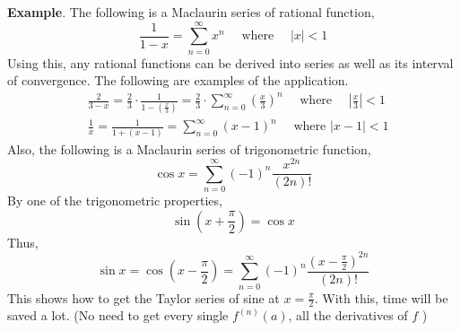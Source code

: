 \textbf{Example}. The following is a Maclaurin series of rational function,
$$
\frac{1}{1-x}=\sum_{n=0}^{\infty} x^{n} \quad \text { where } \quad|x|<1
$$
Using this, any rational functions can be derived into series as well as its interval of convergence. The following are examples of the application.
$$
\begin{aligned}
& \frac{2}{3-x}=\frac{2}{3} \cdot \frac{1}{1-\left(\frac{x}{3}\right)}=\frac{2}{3} \cdot \sum_{n=0}^{\infty}\left(\frac{x}{3}\right)^{n} \quad \text { where } \quad\left|\frac{x}{3}\right|<1 \\
& \frac{1}{x}=\frac{1}{1+(x-1)}=\sum_{n=0}^{\infty}(x-1)^{n} \quad \text { where }|x-1|<1
\end{aligned}
$$
Also, the following is a Maclaurin series of trigonometric function,
$$
\cos x=\sum_{n=0}^{\infty}(-1)^{n} \frac{x^{2 n}}{(2 n)!}
$$
By one of the trigonometric properties,
$$
\sin \left(x+\frac{\pi}{2}\right)=\cos x
$$
Thus,
$$
\sin x=\cos \left(x-\frac{\pi}{2}\right)=\sum_{n=0}^{\infty}(-1)^{n} \frac{\left(x-\frac{\pi}{2}\right)^{2 n}}{(2 n)!}
$$
This shows how to get the Taylor series of sine at $x=\frac{\pi}{2}$. With this, time will be saved a lot. (No need to get every single $f^{(n)}(a)$, all the derivatives of $f$ )


\newpage
